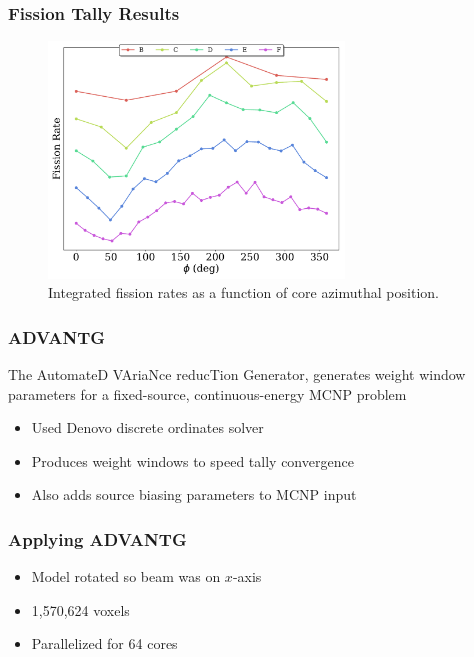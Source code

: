 \documentclass[fleqn]{beamer}
\begin{document}
\begin{frame}
\frametitle{Fission Tally Results}

\begin{figure}
\centering
\includegraphics[width = 0.7\textwidth]{totals_azi}
\caption{Integrated fission rates as a function of core azimuthal position.}
\end{figure}

\end{frame}

\begin{frame}
\frametitle{ADVANTG}

The AutomateD VAriaNce reducTion Generator, generates weight window
parameters for a fixed-source, continuous-energy MCNP problem

\begin{itemize}
\item Used Denovo discrete ordinates solver
\item Produces weight windows to speed tally convergence
\item Also adds source biasing parameters to MCNP input
\end{itemize}

\end{frame}

\begin{frame}
\frametitle{Applying ADVANTG}

\begin{itemize}
\item Model rotated so beam was on $x$-axis
\item 1,570,624 voxels
\item Parallelized for 64 cores
\end{itemize}

\end{frame}
\end{document}
